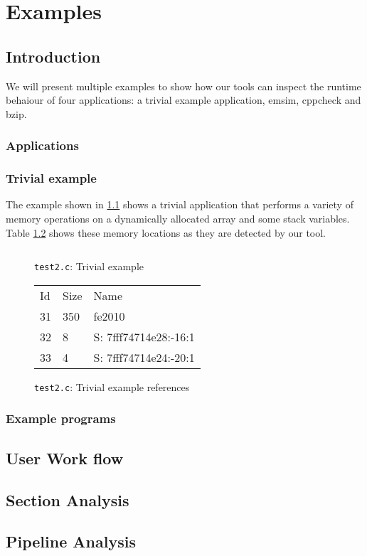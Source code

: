 \chapter{Examples}

\section {Introduction}

We will present multiple examples to show how our tools can inspect the runtime behaiour of four applications: a trivial example application, emsim, cppcheck and bzip.

\subsection{Applications}

\subsection{Trivial example}

The example shown in \ref{cap4:test2} shows a trivial application that performs a variety of memory operations on a dynamically allocated array and some stack variables. Table \ref{cap4:test2references} shows these memory locations as they are detected by our tool.

\begin{figure}
	\begin{center}
		\inputminted[linenos, fontsize=\scriptsize]{c}{test2.c}
	\end{center}
	\caption{\texttt{test2.c}: Trivial example}
	\label{cap4:test2}
\end{figure}

\begin{figure}
	\begin{center}
		\begin{tabular}{l l l}
			Id & Size & Name \\
			31 & 350 & fe2010 \\
			32 & 8 & S: 7fff74714e28:-16:1 \\
			33 & 4 & S: 7fff74714e24:-20:1 \\
		\end{tabular}
	\end{center}
	\caption{\texttt{test2.c}: Trivial example references}
	\label{cap4:test2references}
\end{figure}

\subsection{Example programs}
\section {User Work flow}
\section {Section Analysis}
\section {Pipeline Analysis}